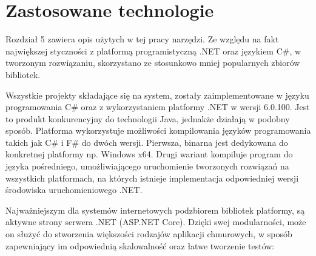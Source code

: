 \section{Zastosowane technologie}

Rozdział 5 zawiera opis użytych w tej pracy narzędzi. Ze względu na fakt największej styczności z platformą programistyczną .NET oraz językiem C\#, w tworzonym rozwiązaniu, skorzystano ze stosunkowo mniej popularnych zbiorów bibliotek.

Wszystkie projekty składające się na system, zostały zaimplementowane w języku programowania C\# oraz z wykorzystaniem platformy .NET w wersji 6.0.100. Jest to produkt konkurencyjny do technologii Java, jednakże działają w podobny sposób. Platforma wykorzystuje możliwości kompilowania języków programowania takich jak C\# i F\#  do dwóch wersji. Pierwsza, binarna jest dedykowana do konkretnej platformy np. Windows x64.  Drugi wariant kompiluje program do języka pośredniego, umożliwiającego  uruchomienie tworzonych rozwiązań na wszystkich platformach, na których istnieje implementacja odpowiedniej wersji środowiska uruchomieniowego .NET.

Najważniejszym dla systemów internetowych podzbiorem bibliotek platformy, są aktywne strony serwera .NET (ASP.NET Core). Dzięki swej modularności, może on służyć do stworzenia większości rodzajów aplikacji chmurowych, w sposób zapewniający im odpowiednią skalowalność oraz łatwe tworzenie testów:

